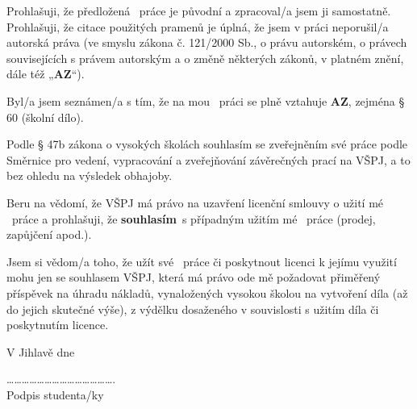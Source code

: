 \begingroup
\setlength{\parskip}{9pt}
  {\def\TypN{diplomová}\def\TypA{diplomovou}\def\TypG{diplomové}}
  {
     {}%
   \def\TypN{bakalářská}\def\TypA{bakalářskou}\def\TypG{bakalářské}}

Prohlašuji, že předložená \TypN\ práce je původní a zpracoval/a jsem ji samostatně. Prohlašuji, že citace použitých pramenů je úplná, že jsem v práci neporušil/a autorská práva (ve smyslu zákona č. 121/2000 Sb., o právu autorském, o právech souvisejících s právem autorským a o změně některých zákonů, v platném znění, dále též „\textbf{AZ}“). 

Byl/a jsem seznámen/a s tím, že na mou \TypA\ práci se plně vztahuje \textbf{AZ}, zejména § 60 (školní dílo).

Podle § 47b zákona o vysokých školách souhlasím se zveřejněním své práce podle Směrnice pro vedení, vypracování a zveřejňování závěrečných prací na VŠPJ, a to bez ohledu na výsledek obhajoby.

Beru na vědomí, že VŠPJ má právo na uzavření licenční smlouvy o užití mé \TypG\ práce a prohlašuji, že \textbf{souhlasím}\ s případným užitím mé \TypG\ práce (prodej, zapůjčení apod.).

Jsem si vědom/a toho, že užít své \TypG\ práce či poskytnout licenci k jejímu využití mohu jen se souhlasem VŠPJ, která má právo ode mě požadovat přiměřený příspěvek na úhradu nákladů, vynaložených vysokou školou na vytvoření díla (až do jejich skutečné výše), z výdělku dosaženého v souvislosti s užitím díla či poskytnutím licence.

V Jihlavě dne \DTMtoday

\vspace{109.5pt}  %

\noindent\hspace{226.8pt}%
\begin{minipage}{198.4pt}
\centering
……………………………………. \\[8.2pt]
Podpis studenta/ky
\end{minipage}

\endgroup
\pagebreak
